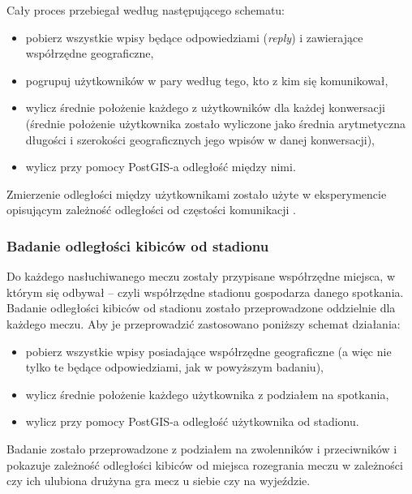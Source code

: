 Cały proces przebiegał według następującego schematu:
\begin{itemize}
  \item pobierz wszystkie wpisy będące odpowiedziami (\textit{reply}) i
  zawierające współrzędne geograficzne,
  \item pogrupuj użytkowników w pary według tego, kto z kim się komunikował,
  \item wylicz średnie położenie każdego z użytkowników dla każdej konwersacji
  (średnie położenie użytkownika zostało wyliczone jako średnia arytmetyczna
długości i szerokości geograficznych jego wpisów w danej konwersacji),
  \item wylicz przy pomocy PostGIS-a odległość między nimi.
\end{itemize}


Zmierzenie odległości między użytkownikami zostało użyte w eksperymencie
opisującym zależność odległości od częstości komunikacji
.



\subsubsection{Badanie odległości kibiców od stadionu}
\label{subsubsection:badanieodleglosciodstadionu}
Do każdego nasłuchiwanego meczu zostały przypisane współrzędne miejsca, w którym
się odbywał -- czyli współrzędne stadionu gospodarza danego spotkania. Badanie
odległości kibiców od stadionu zostało przeprowadzone oddzielnie dla każdego meczu. Aby je
przeprowadzić zastosowano poniższy schemat działania:

\begin{itemize}
  \item pobierz wszystkie wpisy posiadające współrzędne geograficzne (a więc
  nie tylko te będące odpowiedziami, jak w powyższym badaniu),
  \item wylicz średnie położenie każdego użytkownika z podziałem na spotkania,
  \item wylicz przy pomocy PostGIS-a odległość użytkownika od stadionu.
\end{itemize}

Badanie zostało przeprowadzone z podziałem na zwolenników i przeciwników i
pokazuje zależność odległości kibiców od miejsca rozegrania meczu w zależności
czy ich ulubiona drużyna gra mecz u siebie czy na wyjeździe.










